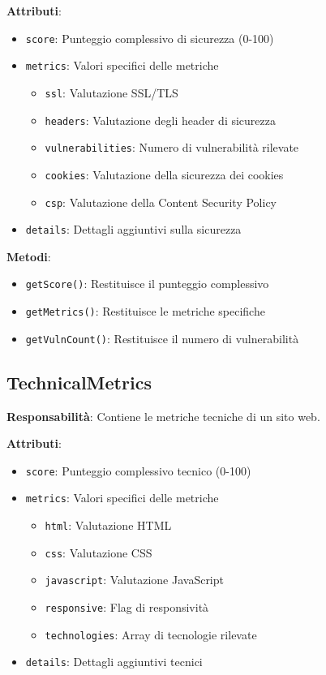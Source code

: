 {{{{{{{\textbf{Attributi}:
\begin{itemize}
    \item \texttt{score}: Punteggio complessivo di sicurezza (0-100)
    \item \texttt{metrics}: Valori specifici delle metriche
    \begin{itemize}
        \item \texttt{ssl}: Valutazione SSL/TLS
        \item \texttt{headers}: Valutazione degli header di sicurezza
        \item \texttt{vulnerabilities}: Numero di vulnerabilità rilevate
        \item \texttt{cookies}: Valutazione della sicurezza dei cookies
        \item \texttt{csp}: Valutazione della Content Security Policy
    \end{itemize}
    \item \texttt{details}: Dettagli aggiuntivi sulla sicurezza
\end{itemize}

\textbf{Metodi}:
\begin{itemize}
    \item \texttt{getScore()}: Restituisce il punteggio complessivo
    \item \texttt{getMetrics()}: Restituisce le metriche specifiche
    \item \texttt{getVulnCount()}: Restituisce il numero di vulnerabilità
\end{itemize}

\subsection{TechnicalMetrics}
\textbf{Responsabilità}: Contiene le metriche tecniche di un sito web.

\textbf{Attributi}:
\begin{itemize}
    \item \texttt{score}: Punteggio complessivo tecnico (0-100)
    \item \texttt{metrics}: Valori specifici delle metriche
    \begin{itemize}
        \item \texttt{html}: Valutazione HTML
        \item \texttt{css}: Valutazione CSS
        \item \texttt{javascript}: Valutazione JavaScript
        \item \texttt{responsive}: Flag di responsività
        \item \texttt{technologies}: Array di tecnologie rilevate
    \end{itemize}
    \item \texttt{details}: Dettagli aggiuntivi tecnici
\end{itemize}

}}}}}}}
